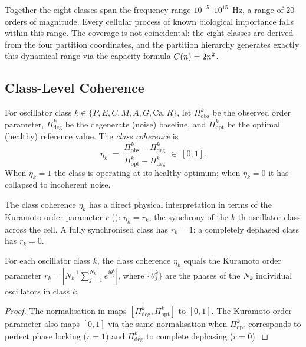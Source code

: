 \begin{remark}
Together the eight classes span the frequency range $10^{-5}$--$10^{15}$~Hz,
a range of 20 orders of magnitude.  Every cellular process of known biological
importance falls within this range.  The coverage is not coincidental: the
eight classes are derived from the four partition coordinates, and the partition
hierarchy generates exactly this dynamical range via the capacity formula
$C(n) = 2n^2$.
\end{remark}

\subsection{Class-Level Coherence}

\begin{definition}
\label{def:class-coherence}
For oscillator class $k \in \{P,E,C,M,A,G,\mathrm{Ca},R\}$, let
$\Pi_\mathrm{obs}^k$ be the observed order parameter, $\Pi_\mathrm{deg}^k$ be
the degenerate (noise) baseline, and $\Pi_\mathrm{opt}^k$ be the optimal
(healthy) reference value.  The \emph{class coherence} is
\begin{equation}
    \eta_k
    \;=\;
    \frac{\Pi_\mathrm{obs}^k - \Pi_\mathrm{deg}^k}
         {\Pi_\mathrm{opt}^k  - \Pi_\mathrm{deg}^k}
    \;\in\; [0,1].
    \label{eq:class-coherence}
\end{equation}
When $\eta_k = 1$ the class is operating at its healthy optimum; when $\eta_k =
0$ it has collapsed to incoherent noise.
\end{definition}

The class coherence $\eta_k$ has a direct physical interpretation in terms of
the Kuramoto order parameter $r$ (): $\eta_k = r_k$,
the synchrony of the $k$-th oscillator class across the cell.  A fully
synchronised class has $r_k = 1$; a completely dephased class has $r_k = 0$.

\begin{proposition}
\label{prop:class-order}
For each oscillator class $k$, the class coherence $\eta_k$ equals the
Kuramoto order parameter $r_k = |N_k^{-1}\sum_{j=1}^{N_k} e^{i\theta_j^k}|$,
where $\{\theta_j^k\}$ are the phases of the $N_k$ individual oscillators in
class $k$.
\end{proposition}

\begin{proof}
The normalisation in  maps $[\Pi_\mathrm{deg}^k,
\Pi_\mathrm{opt}^k]$ to $[0,1]$.  The Kuramoto order parameter also maps
$[0,1]$ via the same normalisation when $\Pi_\mathrm{opt}^k$ corresponds to
perfect phase locking ($r=1$) and $\Pi_\mathrm{deg}^k$ to complete dephasing
($r=0$).
\end{proof}

